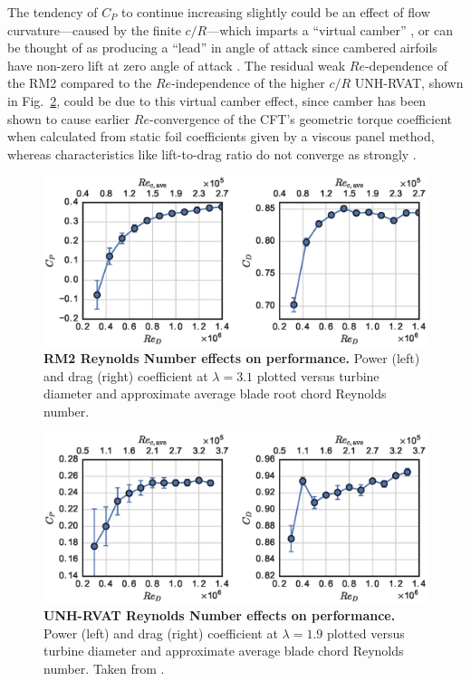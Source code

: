 \documentclass[10pt,letterpaper]{article}
\begin{document}
The tendency of $C_P$ to continue increasing slightly could be an effect of flow
curvature---caused by the finite $c/R$---which imparts a ``virtual camber''
\cite{Migliore1980}, or can be thought of as producing a ``lead'' in angle of
attack since cambered airfoils have non-zero lift at zero angle of attack
\cite{Goude2012}. The residual weak $Re$-dependence of the RM2 compared to the
$Re$-independence of the higher $c/R$ UNH-RVAT, shown in
Fig.~\ref{fig:rvat-perf-re-dep}, could be due to this virtual camber effect,
since camber has been shown to cause earlier $Re$-convergence of the CFT's
geometric torque coefficient when calculated from static foil coefficients given
by a viscous panel method, whereas characteristics like lift-to-drag ratio do
not converge as strongly \cite{Bachant2016-Energies}.

\begin{figure}
    \includegraphics[width=\textwidth]{figures/perf_re_dep.eps}

    \caption{{\bf RM2 Reynolds Number effects on performance.} Power (left) and
    drag (right) coefficient at $\lambda=3.1$ plotted versus turbine diameter
    and approximate average blade root chord Reynolds number.}

    \label{fig:perf-re-dep}
\end{figure}

\begin{figure}
    \includegraphics[width=\textwidth]{figures/RVAT-Re-dep-perf_re_dep.eps}

    \caption{{\bf UNH-RVAT Reynolds Number effects on performance.} Power (left)
    and drag (right) coefficient at $\lambda=1.9$ plotted versus turbine
    diameter and approximate average blade chord Reynolds number. Taken from
    \cite{Bachant2016-Energies}.}

    \label{fig:rvat-perf-re-dep}
\end{figure}
\end{document}
